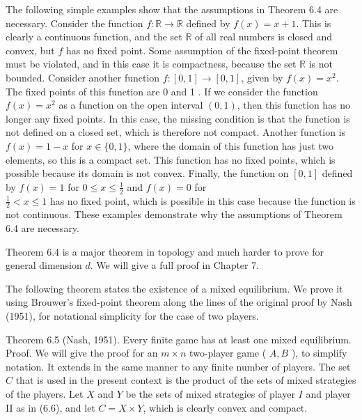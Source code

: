 \documentclass[12pt]{article}
\begin{document}
The following simple examples show that the assumptions in Theorem 6.4 are necessary. Consider the function $f: \mathbb{R} \rightarrow \mathbb{R}$ defined by $f(x)=x+1$. This is clearly a continuous function, and the set $\mathbb{R}$ of all real numbers is closed and convex, but $f$ has no fixed point. Some assumption of the fixed-point theorem must be violated, and in this case it is compactness, because the set $\mathbb{R}$ is not bounded. Consider another function $f:[0,1] \rightarrow[0,1]$, given by $f(x)=x^{2}$. The fixed points of this function are 0 and 1 . If we consider the function $f(x)=x^{2}$ as a function on the open interval $(0,1)$, then this function has no longer any fixed points. In this case, the missing condition is that the function is not defined on a closed set, which is therefore not compact. Another function is $f(x)=1-x$ for $x \in\{0,1\}$, where the domain of this function has just two elements, so this is a compact set. This function has no fixed points, which is possible because its domain is not convex. Finally, the function on $[0,1]$ defined by $f(x)=1$ for $0 \leq x \leq \frac{1}{2}$ and $f(x)=0$ for\\
$\frac{1}{2}<x \leq 1$ has no fixed point, which is possible in this case because the function is not continuous. These examples demonstrate why the assumptions of Theorem 6.4 are necessary.

Theorem 6.4 is a major theorem in topology and much harder to prove for general dimension $d$. We will give a full proof in Chapter 7.

The following theorem states the existence of a mixed equilibrium. We prove it using Brouwer's fixed-point theorem along the lines of the original proof by Nash (1951), for notational simplicity for the case of two players.

Theorem 6.5 (Nash, 1951). Every finite game has at least one mixed equilibrium.\\
Proof. We will give the proof for an $m \times n$ two-player game ( $A, B$ ), to simplify notation. It extends in the same manner to any finite number of players. The set $C$ that is used in the present context is the product of the sets of mixed strategies of the players. Let $X$ and $Y$ be the sets of mixed strategies of player $I$ and player II as in (6.6), and let $C=X \times Y$, which is clearly convex and compact.
\end{document}
